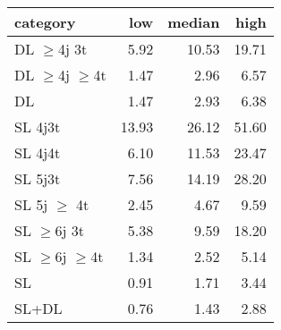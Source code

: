 \begin{tabular}{lrrr}
\hline
 category             &   low &   median &   high \\
\hline
 DL $\geq$4j 3t       &  5.92 &    10.53 &  19.71 \\
 DL $\geq$4j $\geq$4t &  1.47 &     2.96 &   6.57 \\
 DL                   &  1.47 &     2.93 &   6.38 \\
 SL 4j3t              & 13.93 &    26.12 &  51.60 \\
 SL 4j4t              &  6.10 &    11.53 &  23.47 \\
 SL 5j3t              &  7.56 &    14.19 &  28.20 \\
 SL 5j $\geq$ 4t      &  2.45 &     4.67 &   9.59 \\
 SL $\geq$6j $3$t     &  5.38 &     9.59 &  18.20 \\
 SL $\geq$6j $\geq$4t &  1.34 &     2.52 &   5.14 \\
 SL                   &  0.91 &     1.71 &   3.44 \\
 SL+DL                &  0.76 &     1.43 &   2.88 \\
\hline
\end{tabular}